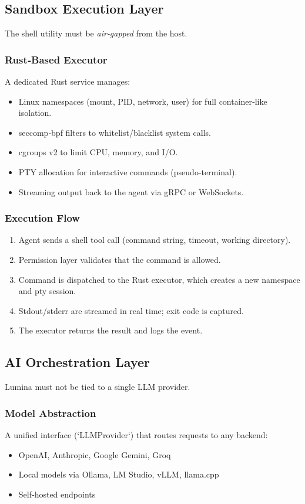 \documentclass[12pt,a4paper]{article}
\begin{document}
\subsection{Sandbox Execution Layer}
The shell utility must be \emph{air‑gapped} from the host.

\subsubsection{Rust‑Based Executor}
A dedicated Rust service manages:
\begin{itemize}[leftmargin=*]
    \item Linux namespaces (mount, PID, network, user) for full container‑like isolation.
    \item seccomp‑bpf filters to whitelist/blacklist system calls.
    \item cgroups v2 to limit CPU, memory, and I/O.
    \item PTY allocation for interactive commands (pseudo‑terminal).
    \item Streaming output back to the agent via gRPC or WebSockets.
\end{itemize}

\subsubsection{Execution Flow}
\begin{enumerate}[leftmargin=*]
    \item Agent sends a shell tool call (command string, timeout, working directory).
    \item Permission layer validates that the command is allowed.
    \item Command is dispatched to the Rust executor, which creates a new namespace and pty session.
    \item Stdout/stderr are streamed in real time; exit code is captured.
    \item The executor returns the result and logs the event.
\end{enumerate}

\subsection{AI Orchestration Layer}
Lumina must not be tied to a single LLM provider.

\subsubsection{Model Abstraction}
A unified interface (`LLMProvider`) that routes requests to any backend:
\begin{itemize}[leftmargin=*]
    \item OpenAI, Anthropic, Google Gemini, Groq
    \item Local models via Ollama, LM Studio, vLLM, llama.cpp
    \item Self‑hosted endpoints
\end{itemize}
\end{document}
